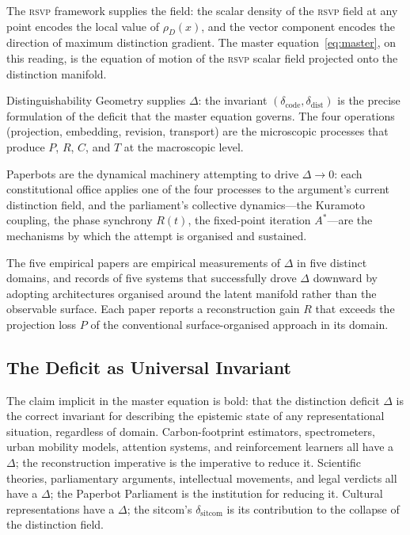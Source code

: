 \documentclass[12pt, letterpaper]{article}
\theoremstyle{remark}
\newcommand{\rsvp}{\textsc{rsvp}}
\newcommand{\Dc}{\delta_{\mathrm{code}}}
\newcommand{\Dd}{\delta_{\mathrm{dist}}}
\begin{document}
The \rsvp{} framework supplies the field: the scalar density of the \rsvp{}
field at any point encodes the local value of $\rho_D(x)$, and the vector
component encodes the direction of maximum distinction gradient.  The
master equation~\eqref{eq:master}, on this reading, is the equation of motion
of the \rsvp{} scalar field projected onto the distinction manifold.

Distinguishability Geometry supplies $\Delta$: the invariant $(\Dc, \Dd)$
is the precise formulation of the deficit that the master equation governs.
The four operations (projection, embedding, revision, transport) are the
microscopic processes that produce $P$, $R$, $C$, and $T$ at the macroscopic
level.

Paperbots are the dynamical machinery attempting to drive $\Delta \to 0$:
each constitutional office applies one of the four processes to the argument's
current distinction field, and the parliament's collective dynamics---the
Kuramoto coupling, the phase synchrony $R(t)$, the fixed-point iteration
$A^*$---are the mechanisms by which the attempt is organised and sustained.

The five empirical papers are empirical measurements of $\Delta$ in five
distinct domains, and records of five systems that successfully drove $\Delta$
downward by adopting architectures organised around the latent manifold rather
than the observable surface.  Each paper reports a reconstruction gain $R$
that exceeds the projection loss $P$ of the conventional surface-organised
approach in its domain.

\subsection{The Deficit as Universal Invariant}

The claim implicit in the master equation is bold: that the distinction
deficit $\Delta$ is the correct invariant for describing the epistemic state
of any representational situation, regardless of domain.  Carbon-footprint
estimators, spectrometers, urban mobility models, attention systems, and
reinforcement learners all have a $\Delta$; the reconstruction imperative
is the imperative to reduce it.  Scientific theories, parliamentary arguments,
intellectual movements, and legal verdicts all have a $\Delta$; the
Paperbot Parliament is the institution for reducing it.  Cultural
representations have a $\Delta$; the sitcom's $\delta_{\text{sitcom}}$ is
its contribution to the collapse of the distinction field.
\end{document}
